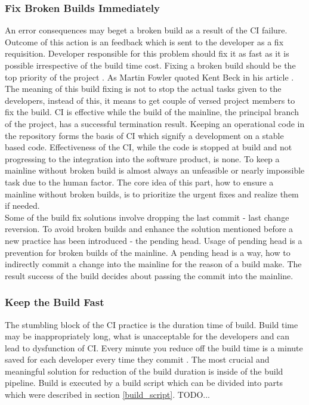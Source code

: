 \subsubsection{Fix Broken Builds Immediately}

An error consequences may beget a broken build as a result of the CI failure. Outcome of this action is an feedback which is sent to the developer as a fix requisition. Developer responsible for this problem should fix it as fast as it is possible irrespective of the build time cost. Fixing a broken build should be the top priority of the project \cite{CIQualityFramework}. As Martin Fowler quoted Kent Beck in his article  \cite{MartinFowler}. The meaning of this build fixing is not to stop the actual tasks given to the developers, instead of this, it means to get couple of versed project members to fix the build. CI is effective while the build of the mainline, the principal branch of the project, has a successful termination result. Keeping an operational code in the repository forms the basis of CI which signify a development on a stable based code. Effectiveness of the CI, while the code is stopped at build and not progressing to the integration into the software product, is none. To keep a mainline without broken build is almost always an unfeasible or nearly impossible task due to the human factor. The core idea of this part, how to ensure a mainline without broken builds, is to prioritize the urgent fixes and realize them if needed.\\

Some of the build fix solutions involve dropping the last commit - last change reversion. To avoid broken builds and enhance the solution mentioned before a new practice has been introduced - the pending head. Usage of pending head is a prevention for broken builds of the mainline. A pending head is a way, how to indirectly commit a change into the mainline for the reason of a build make. The result success of the build decides about passing the commit into the mainline.

\subsubsection{Keep the Build Fast}

The stumbling block of the CI practice is the duration time of build. Build time may be inappropriately long, what is unacceptable for the developers and can lead to dysfunction of CI. Every minute you reduce off the build time is a minute saved for each developer every time they commit \cite{MartinFowler}. The most crucial and meaningful solution for reduction of the build duration is inside of the build pipeline. Build is executed by a build script which can be divided into parts which were described in section \ref{build_script}. {\color{red}TODO...}



